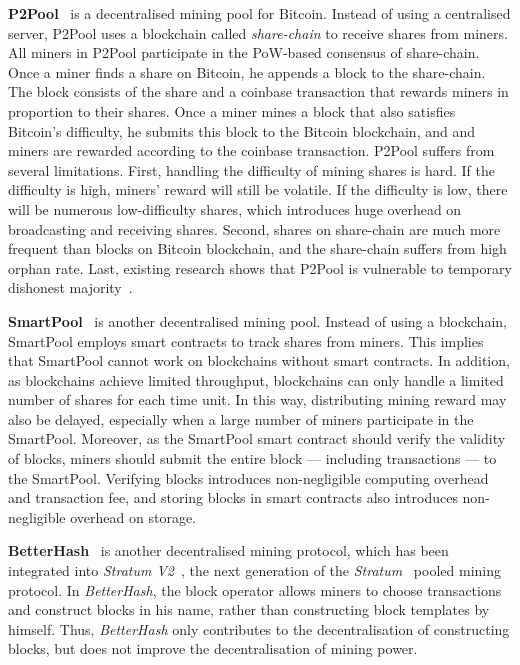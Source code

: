\textbf{P2Pool}~\cite{voight2011p2pool} is a decentralised mining pool for Bitcoin.
Instead of using a centralised server, P2Pool uses a blockchain called \emph{share-chain} to receive shares from miners.
All miners in P2Pool participate in the PoW-based consensus of share-chain.
Once a miner finds a share on Bitcoin, he appends a block to the share-chain.
The block consists of the share and a coinbase transaction that rewards miners in proportion to their shares.
Once a miner mines a block that also satisfies Bitcoin's difficulty, he submits this block to the Bitcoin blockchain, and and miners are rewarded according to the coinbase transaction.
P2Pool suffers from several limitations.
First, handling the difficulty of mining shares is hard.
If the difficulty is high, miners' reward will still be volatile.
If the difficulty is low, there will be numerous low-difficulty shares, which introduces huge overhead on broadcasting and receiving shares.
Second, shares on share-chain are much more frequent than blocks on Bitcoin blockchain, and the share-chain suffers from high orphan rate.
Last, existing research shows that P2Pool is vulnerable to temporary dishonest majority~\cite{decentralised-mining-pool-security}.

\textbf{SmartPool}~\cite{luu2017smartpool} is another decentralised mining pool.
Instead of using a blockchain, SmartPool employs smart contracts to track shares from miners.
This implies that SmartPool cannot work on blockchains without smart contracts.
In addition, as blockchains achieve limited throughput, blockchains can only handle a limited number of shares for each time unit.
In this way, distributing mining reward may also be delayed, especially when a large number of miners participate in the SmartPool.
Moreover, as the SmartPool smart contract should verify the validity of blocks, miners should submit the entire block --- including transactions --- to the SmartPool.
Verifying blocks introduces non-negligible computing overhead and transaction fee, and storing blocks in smart contracts also introduces non-negligible overhead on storage.



\textbf{BetterHash}~\cite{draft-bip-BetterHash} is another decentralised mining protocol, which has been integrated into \emph{Stratum V2}~\cite{stratum-v2}, the next generation of the \textit{Stratum}~\cite{stratum} pooled mining protocol.
In \textit{BetterHash}, the block operator allows miners to choose transactions and construct blocks in his name, rather than constructing block templates by himself.
Thus, \textit{BetterHash} only contributes to the decentralisation of constructing blocks, but does not improve the decentralisation of mining power.
